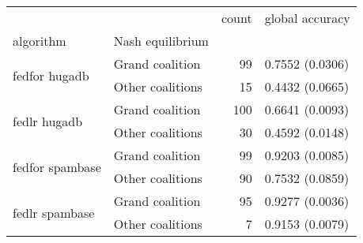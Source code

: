 \begin{tabular}{llrl}
\toprule
 &  & count & global accuracy \\
algorithm & Nash equilibrium &  &  \\
\midrule
\multirow[t]{2}{*}{fedfor hugadb} & Grand coalition & 99 & 0.7552 (0.0306) \\
 & Other coalitions & 15 & 0.4432 (0.0665) \\
\cline{1-4}
\multirow[t]{2}{*}{fedlr hugadb} & Grand coalition & 100 & 0.6641 (0.0093) \\
 & Other coalitions & 30 & 0.4592 (0.0148) \\
\cline{1-4}
\multirow[t]{2}{*}{fedfor spambase} & Grand coalition & 99 & 0.9203 (0.0085) \\
 & Other coalitions & 90 & 0.7532 (0.0859) \\
\cline{1-4}
\multirow[t]{2}{*}{fedlr spambase} & Grand coalition & 95 & 0.9277 (0.0036) \\
 & Other coalitions & 7 & 0.9153 (0.0079) \\
\cline{1-4}
\bottomrule
\end{tabular}
